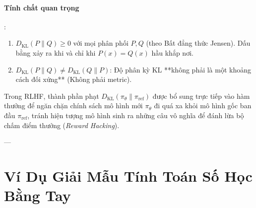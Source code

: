 \paragraph{Tính chất quan trọng}:
\begin{enumerate}
  \item $D_{\text{KL}}(P \parallel Q) \ge 0$ với mọi phân phối $P, Q$ (theo Bất đẳng thức Jensen). Dấu bằng xảy ra khi và chỉ khi $P(x) = Q(x)$ hầu khắp nơi.
  \item $D_{\text{KL}}(P \parallel Q) \ne D_{\text{KL}}(Q \parallel P)$: Độ phân kỳ KL **không phải là một khoảng cách đối xứng** (Không phải metric).
\end{enumerate}

Trong RLHF, thành phần phạt $D_{\text{KL}}(\pi_\theta \parallel \pi_{\text{ref}})$ được bổ sung trực tiếp vào hàm thưởng để ngăn chặn chính sách mô hình mới $\pi_\theta$ đi quá xa khỏi mô hình gốc ban đầu $\pi_{\text{ref}}$, tránh hiện tượng mô hình sinh ra những câu vô nghĩa để đánh lừa bộ chấm điểm thưởng (\textit{Reward Hacking}).

---

\section{Ví Dụ Giải Mẫu Tính Toán Số Học Bằng Tay}
\label{sec:ch04-numerical-walkthrough}

